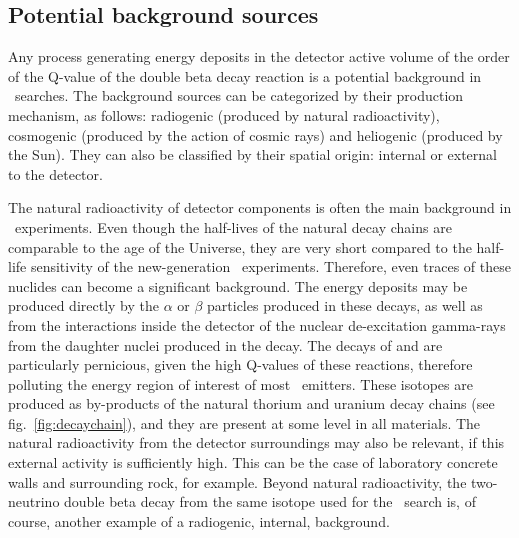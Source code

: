 
\subsection{Potential background sources} \label{subsec:bgr_sources}

Any process generating energy deposits in the detector active volume of the order of the Q-value of the double beta decay reaction is a potential background in \bbonu\ searches. The background sources can be categorized by their production mechanism, as follows: radiogenic (produced by natural radioactivity), cosmogenic (produced by the action of cosmic rays) and heliogenic (produced by the Sun). They can also be classified by their spatial origin: internal or external to the detector.

The natural radioactivity of detector components is often the main background in \bbonu\ experiments. Even though the half-lives of the natural decay chains are comparable to the age of the Universe, they are very short compared to the half-life sensitivity of the new-generation \bbonu\ experiments. Therefore, even traces of these nuclides can become a significant background. The energy deposits may be produced directly by the $\alpha$ or $\beta$ particles produced in these decays, as well as from the interactions inside the detector of the nuclear de-excitation gamma-rays from the daughter nuclei produced in the decay. The decays of  and  are particularly pernicious, given the high Q-values of these reactions, therefore polluting the energy region of interest of most \bb\ emitters. These isotopes are produced as by-products of the natural thorium and uranium decay chains (see fig.~\ref{fig:decaychain}), and they are present at some level in all materials. The natural radioactivity from the detector surroundings may also be relevant, if this external activity is sufficiently high. This can be the case of laboratory concrete walls and surrounding rock, for example. Beyond natural radioactivity, the two-neutrino double beta decay from the same isotope used for the \bbonu\ search is, of course, another example of a radiogenic, internal, background. 

